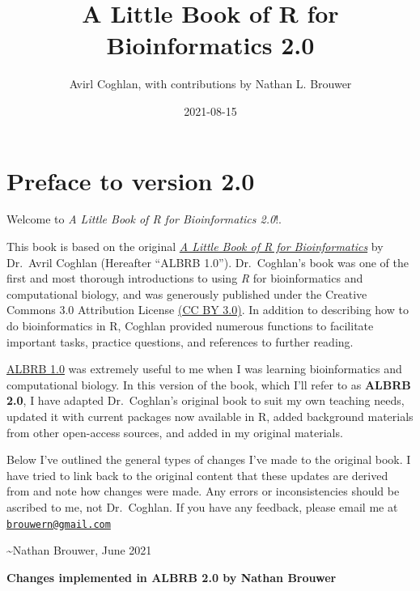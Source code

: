 \documentclass[
]{book}
\title{A Little Book of R for Bioinformatics 2.0}
\author{Avirl Coghlan, with contributions by Nathan L. Brouwer}
\date{2021-08-15}
\begin{document}
\maketitle

{
\setcounter{tocdepth}{1}
\tableofcontents
}
\hypertarget{preface-to-version-2.0}{%
\chapter*{Preface to version 2.0}\label{preface-to-version-2.0}}

Welcome to \emph{A Little Book of R for Bioinformatics 2.0}!.

This book is based on the original \href{https://a-little-book-of-r-for-bioinformatics.readthedocs.io/en/latest/}{\emph{A Little Book of R for Bioinformatics}} by Dr.~Avril Coghlan (Hereafter ``ALBRB 1.0''). Dr.~Coghlan's book was one of the first and most thorough introductions to using \emph{R} for bioinformatics and computational biology, and was generously published under the Creative Commons 3.0 Attribution License \href{https://creativecommons.org/licenses/by/3.0/}{(CC BY 3.0)}. In addition to describing how to do bioinformatics in R, Coghlan provided numerous functions to facilitate important tasks, practice questions, and references to further reading.

\href{https://a-little-book-of-r-for-bioinformatics.readthedocs.io/en/latest/}{ALBRB 1.0} was extremely useful to me when I was learning bioinformatics and computational biology. In this version of the book, which I'll refer to as \textbf{ALBRB 2.0}, I have adapted Dr.~Coghlan's original book to suit my own teaching needs, updated it with current packages now available in R, added background materials from other open-access sources, and added in my original materials.

Below I've outlined the general types of changes I've made to the original book. I have tried to link back to the original content that these updates are derived from and note how changes were made. Any errors or inconsistencies should be ascribed to me, not Dr.~Coghlan. If you have any feedback, please email me at \href{mailto:brouwern@gmail.com}{\nolinkurl{brouwern@gmail.com}}

\textasciitilde Nathan Brouwer, June 2021

\textbf{Changes implemented in ALBRB 2.0 by Nathan Brouwer}
\end{document}

